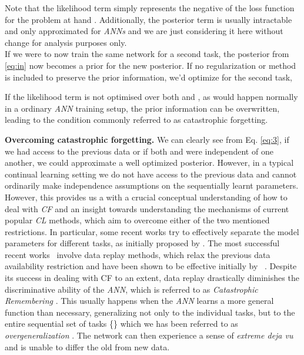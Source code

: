 \documentclass{article}
\begin{document}
Note that the likelihood term  simply represents the negative of the loss function for the problem at hand \cite{kirkpatrick2017overcoming}. Additionally, the posterior term is usually intractable and only approximated for \textit{ANNs} \cite{titsias2019functional, nguyen2017variational, kirkpatrick2017overcoming} and we are just considering it here without change for analysis purposes only.\\
If we were to now train the same network for a second task, the posterior from \eqref{eq:in} now becomes a prior for the new posterior. If no regularization or method is included to preserve the prior information, we'd optimize for the second task,

If the likelihood term is not optimised over both  and , as would happen normally in a ordinary \textit{ANN} training setup, 
the prior information can be overwritten, leading to the condition commonly  referred to as catastrophic forgetting.

\textbf{Overcoming catastrophic forgetting.} We can clearly see from Eq. \ref{eq:3}, if we had access to the previous data  or if both  and   were independent of one another, we could approximate a well optimized posterior. However, in a typical continual learning setting we do not have access to the previous data and cannot ordinarily make independence assumptions on the sequentially learnt parameters. However, this provides us a with a crucial conceptual understanding of how to deal with \textit{CF} and an insight towards understanding the mechanisms of current popular \textit{CL} methods, which aim to overcome either of the two mentioned restrictions.
In particular, some recent works \cite{mallya, Serr2018OvercomingCF, jung2020continual} try to effectively separate the model parameters  for different tasks, as initially proposed by \cite{French94dynamicallyconstraining}. 
The most successful recent works~\cite{pan2021continual, titsias2019functional, Chaudhry_2018_ECCV, guo2020improved, fear17} involve data replay methods, which relax the previous data availability restriction and have been shown to be effective initially by ~\cite{robins_catastrophic_1993}.
Despite its success in dealing with CF to an extent, data replay drastically diminishes the discriminative ability of the \textit{ANN}, which is referred to as \textit{Catastrophic Remembering} \cite{robins_catastrophic_1993}. This usually happens when the \textit{ANN} learns a more general function  than necessary,  generalizing 
not only to the individual tasks, but to the entire sequential set of tasks \{\} which we has been referred to as \textit{overgeneralization} \cite{robins_catastrophic_1993}. 
The network can then experience a sense of \textit{extreme deja vu} \cite{doi:10.1080/09540099550039264} and is unable to differ the old from new data. 
\end{document}
